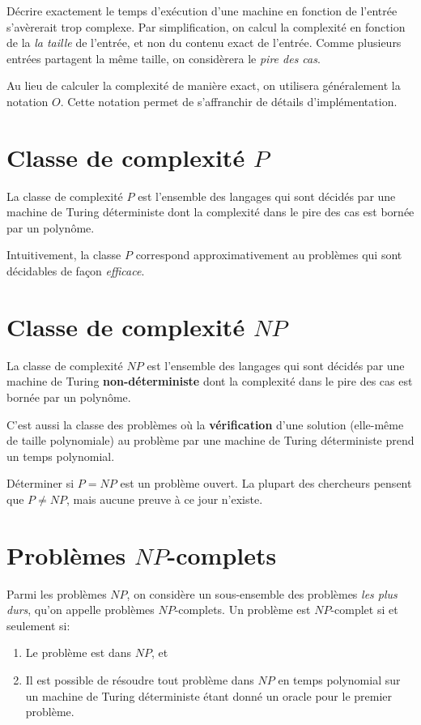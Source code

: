 Décrire exactement le temps d'exécution d'une machine en fonction de l'entrée s'avèrerait trop complexe.
Par simplification, on calcul la complexité en fonction de la \emph{la taille} de l'entrée, et non du contenu exact de l'entrée.
Comme plusieurs entrées partagent la même taille, on considèrera le \emph{pire des cas}.

Au lieu de calculer la complexité de manière exact, on utilisera généralement la notation $O$.
Cette notation permet de s'affranchir de détails d'implémentation.

\section{Classe de complexité $P$}

La classe de complexité $P$ est l'ensemble des langages qui sont décidés par une machine de Turing déterministe dont la complexité dans le pire des cas est bornée par un polynôme.

Intuitivement, la classe $P$ correspond approximativement au problèmes qui sont décidables de façon \emph{efficace}.

\section{Classe de complexité $NP$}

La classe de complexité $NP$ est l'ensemble des langages qui sont décidés par une machine de Turing \textbf{non-déterministe} dont la complexité dans le pire des cas est bornée par un polynôme.

C'est aussi la classe des problèmes où la \textbf{vérification} d'une solution (elle-même de taille polynomiale) au problème par une machine de Turing déterministe prend un temps polynomial.

Déterminer si $P = NP$ est un problème ouvert.
La plupart des chercheurs pensent que $P \neq NP$, mais aucune preuve à ce jour n'existe.

\section{Problèmes $NP$-complets}

Parmi les problèmes $NP$, on considère un sous-ensemble des problèmes \textit{les plus durs}, qu'on appelle problèmes $NP$-complets.
Un problème est $NP$-complet si et seulement si:
\begin{enumerate}
\item Le problème est dans $NP$, et
\item Il est possible de résoudre tout problème dans $NP$ en temps polynomial sur un machine de Turing déterministe étant donné un oracle pour le premier problème.
\end{enumerate} 

